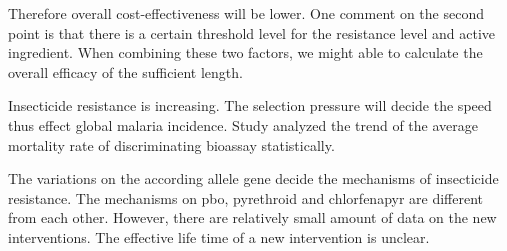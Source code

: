 \documentclass[a4paper, 12pt, twoside]{report}
\begin{document}

Therefore overall cost-effectiveness will be lower.
One comment on the second point is that there is a certain threshold level for the resistance level and active ingredient.
When combining these two factors, we might able to calculate the overall efficacy of the sufficient length.

Insecticide resistance is increasing.
The selection pressure will decide the speed thus effect global malaria incidence.
Study\cite{Churcher2016a} analyzed the trend of the average mortality rate of discriminating bioassay statistically.

The variations on the according allele gene decide the mechanisms of insecticide resistance.
The mechanisms on \gls{pbo}, pyrethroid and chlorfenapyr are different from each other.
However, there are relatively small amount of data on the new interventions.
The effective life time of a new intervention is unclear.



%
%



\end{document}
